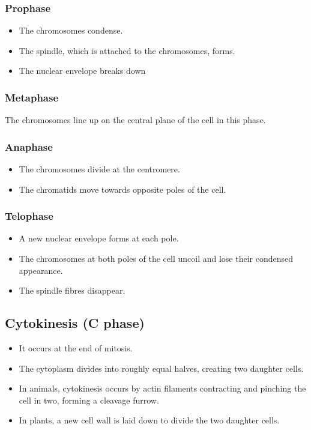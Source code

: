 \documentclass[11pt]{article}
\begin{document}
\subsubsection{Prophase}
\label{sec:orgb63cf0b}
\begin{itemize}
\item The chromosomes condense.
\item The spindle, which is attached to the chromosomes, forms.
\item The nuclear envelope breaks down
\end{itemize}

\subsubsection{Metaphase}
\label{sec:org57356a4}
The chromosomes line up on the central plane of the cell in this phase.

\subsubsection{Anaphase}
\label{sec:org02bf1b4}
\begin{itemize}
\item The chromosomes divide at the centromere.
\item The chromatids move towards opposite poles of the cell.
\end{itemize}

\subsubsection{Telophase}
\label{sec:org4d2f95d}
\begin{itemize}
\item A new nuclear envelope forms at each pole.
\item The chromosomes at both poles of the cell uncoil and lose their condensed appearance.
\item The spindle fibres disappear.
\end{itemize}

\subsection{Cytokinesis (C phase)}
\label{sec:org0f8bff9}
\begin{itemize}
\item It occurs at the end of mitosis.
\item The cytoplasm divides into roughly equal halves, creating two daughter cells.
\item In animals, cytokinesis occurs by actin filaments contracting and pinching the cell in two, forming a cleavage furrow.
\item In plants, a new cell wall is laid down to divide the two daughter cells.
\end{itemize}
\end{document}
